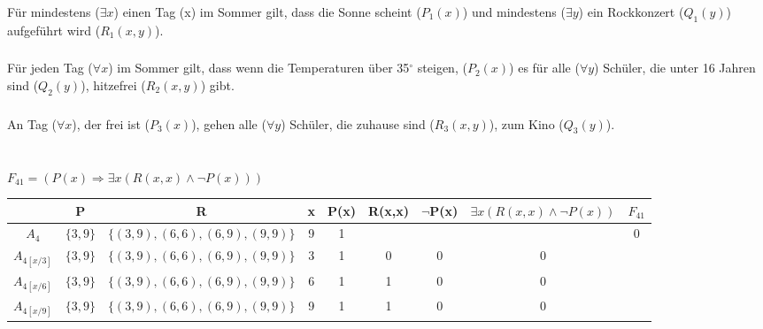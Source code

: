 \documentclass[10pt,a4paper,oneside,ngerman,numbers=noenddot]{scrartcl}
\def\thesubsubsection{(\alph{subsubsection})}
\begin{document}
\subsubsection{} %
Für mindestens ($\exists x$) einen Tag (x) im Sommer gilt, dass die Sonne scheint ($P_{1}(x)$) und mindestens ($\exists y$) ein Rockkonzert ($Q_{1}(y)$) aufgeführt wird ($R_{1}(x,y)$). 
\subsubsection{} %
Für jeden Tag ($\forall x$) im Sommer gilt, dass wenn die Temperaturen über 35$^{\circ}$ steigen, ($P_{2}(x)$) es für alle ($\forall y$) Schüler, die unter 16 Jahren sind ($Q_{2}(y)$), hitzefrei ($R_{2}(x,y)$) gibt.
\subsubsection{} %
An Tag ($\forall x$), der frei ist ($P_{3}(x)$), gehen alle ($\forall y$) Schüler, die zuhause sind ($R_{3}(x,y)$), zum Kino ($Q_{3}(y)$).
\subsubsection{} %

\subsubsection{} %
\section{} %
\def\thesubsubsection{\arabic{subsubsection}.}
\setcounter{subsubsection}{0}
\subsubsection{} %
$F_{41} = (P(x) \Rightarrow \exists x (R(x,x) \wedge \neg P(x)))$\\
\begin{tabular}{c|c|c|c|c|c|c|c|c}
& P & R & x & P(x) & R(x,x) & $\neg$P(x) & $\exists x (R(x,x) \wedge \neg P(x)) $ & $F_{41}$ \\
\hline
$A_{4}$ & $\{3,9\}$ & $\{(3,9),(6,6), (6,9), (9,9)\}$ & 9 & 1 & & & & 0 \\
\hline
$A_{4[x/3]}$ & $\{3,9\}$ & $\{(3,9),(6,6), (6,9), (9,9)\}$ & 3 & 1 & 0 & 0 & 0 \\
$A_{4[x/6]}$ & $\{3,9\}$ & $\{(3,9),(6,6), (6,9), (9,9)\}$ & 6 & 1 & 1 & 0 & 0 \\
$A_{4[x/9]}$ & $\{3,9\}$ & $\{(3,9),(6,6), (6,9), (9,9)\}$ & 9 & 1 & 1 & 0 & 0
\end{tabular}
\end{document}
